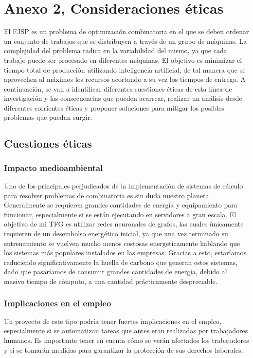 \section{Anexo 2, Consideraciones éticas}
El FJSP es un problema de optimización combinatoria en el que se deben ordenar un 
conjunto de trabajos que se distribuyen a través de un grupo de máquinas. La 
complejidad del problema radica en la variabilidad del mismo, ya que cada trabajo 
puede ser procesado en diferentes máquinas. El objetivo es minimizar el tiempo 
total de producción utilizando inteligencia artificial, de tal manera que se 
aprovechen al máximos los recursos acortando a su vez los tiempos de entrega. A 
continuación, se van a identificar diferentes cuestiones éticas de esta línea de 
investigación y las consecuencias que pueden acarrear, realizar un análisis desde
diferentes corrientes éticas y proponer soluciones para mitigar los posibles
problemas que puedan surgir. 

\subsection{Cuestiones éticas}
\subsubsection{Impacto medioambiental}
Uno de los principales perjudicados de la implementación de sistemas de cálculo 
para resolver problemas de combinatoria es sin duda nuestro planeta. Generalmente 
se requieren grandes cantidades de energía y equipamiento para funcionar, 
especialmente si se están ejecutando en servidores a gran escala. El objetivo de 
mi TFG es utilizar redes neuronales de grafos, las cuales únicamente requieren de 
un desembolso energético inicial, ya que una vez terminado su entrenamiento se 
vuelven mucho menos costosas energeticamente hablando que los sistemas más populares 
instalados en las empresas. Gracias a esto, estaríamos reduciendo significativamente 
la huella de carbono que generan estos sistemas, dado que pasaríamos de consumir 
grandes cantidades de energía, debido al masivo tiempo de cómputo, a una cantidad 
prácticamente despreciable.

\subsubsection{Implicaciones en el empleo}
Un proyecto de este tipo podría tener fuertes implicaciones en el empleo, especialmente 
si se automatizan tareas que antes eran realizadas por trabajadores humanos. Es 
importante tener en cuenta cómo se verán afectados los trabajadores y si se tomarán 
medidas para garantizar la protección de sus derechos laborales.\medskip

